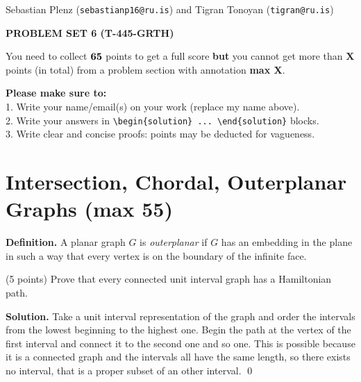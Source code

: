 \documentclass[a4paper,11pt]{amsart}
\newcounter{temp}
\newcounter{prob_counter}
\newenvironment{problem}
{\begin{list}{{\bf \arabic{prob_counter}}}{
      \usecounter{prob_counter}
      \addtolength{\labelsep}{.6ex}
      \addtolength{\itemsep}{4.3ex}
      \setlength{\leftmargin}{1.4em}}
      \setcounter{prob_counter}{\value{temp}}
}
{\setcounter{temp}{\value{prob_counter}}  
  \end{list}
}
\newenvironment{solution}{\textbf{Solution.}}{\qed}
\newcommand{\rubrik}[1]{\bigskip \begin{center}{\bf #1}\end{center} \medskip}
\begin{document}
\pagestyle{empty}
\thispagestyle{empty}

{\small{\sc\noindent
        Sebastian Plenz ({\tt sebastianp16@ru.is}) and Tigran Tonoyan ({\tt tigran@ru.is})
}}

\rubrik{PROBLEM SET 6 (T-445-GRTH)}

You need to collect $\bf 65$ points to get a full score {\bf but} you cannot get more than {\bf X} points (in total) from a problem section with annotation {\bf max X}.

{\bf Please make sure to:}\\
1. Write your name/email(s) on your work (replace my name above).\\
2. Write your answers in \texttt{{\textbackslash}begin\{solution\} ... {\textbackslash}end\{solution\}} blocks.\\
3. Write clear and concise proofs: points may be deducted for vagueness.




\section{Intersection, Chordal, Outerplanar Graphs ({\bf max 55})}

{\bf Definition.} A planar graph $G$ is \emph{outerplanar} if $G$ has an embedding in the plane in such a way that every vertex is on the boundary of the infinite face.

\begin{problem}
 \item (5 points) Prove that every connected unit interval graph has a Hamiltonian path.
\end{problem}
\begin{solution}
	Take a unit interval representation of the graph and order the intervals from the lowest beginning to the highest one. Begin the path at the vertex of the first interval and connect it to the second one and so one. This is possible because it is a connected graph and the intervals all have the same length, so there exists no interval, that is a proper subset of an other interval.
\end{solution}
\end{document}
